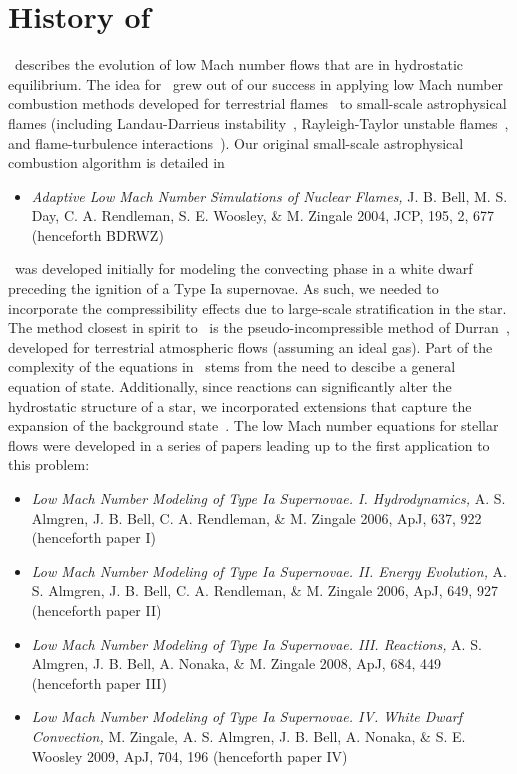\section{History of \maestro}

\maestro\ describes the evolution of low Mach number flows that are in
hydrostatic equilibrium.  The idea for \maestro\ grew out of our
success in applying low Mach number combustion methods developed for
terrestrial flames~\cite{DayBell00} to small-scale astrophysical
flames (including Landau-Darrieus instability~\cite{SNld},
Rayleigh-Taylor unstable flames~\cite{SNrt3d}, and flame-turbulence
interactions~\cite{SNturb}).  Our original small-scale astrophysical
combustion algorithm is detailed in
\begin{itemize}
\item {\em Adaptive Low Mach Number Simulations of Nuclear Flames,}
J. B. Bell, M. S. Day, C. A. Rendleman, S. E. Woosley, \& M. Zingale
2004, JCP, 195, 2, 677 (henceforth BDRWZ)
\end{itemize}

\noindent \maestro\ was developed initially for modeling the convecting
phase in a white dwarf preceding the ignition of a Type Ia supernovae.
As such, we needed to incorporate the compressibility effects due to
large-scale stratification in the star.  The method closest in spirit
to \maestro\ is the pseudo-incompressible method of
Durran~\cite{durran}, developed for terrestrial atmospheric flows
(assuming an ideal gas).  Part of the complexity of the equations in
\maestro\ stems from the need to descibe a general equation of state.
Additionally, since reactions can significantly alter the hydrostatic
structure of a star, we incorporated extensions that capture the
expansion of the background state~\cite{almgren:2000}.  The low Mach
number equations for stellar flows were developed in a series of
papers leading up to the first application to this problem:
\begin{itemize}
\item {\em Low Mach Number Modeling of Type Ia
  Supernovae. I. Hydrodynamics,} A. S. Almgren, J. B. Bell, 
  C. A. Rendleman, \& M. Zingale 2006, ApJ, 637, 922 (henceforth
  paper I)
\item {\em Low Mach Number Modeling of Type Ia Supernovae. II. Energy
  Evolution,} A. S. Almgren, J. B. Bell, C. A. Rendleman, \& M. Zingale
  2006, ApJ, 649, 927 (henceforth paper II)
\item {\em Low Mach Number Modeling of Type Ia Supernovae. III. Reactions,}
  A. S. Almgren, J. B. Bell, A. Nonaka, \& M. Zingale
  2008, ApJ, 684, 449 (henceforth paper III)
\item {\em Low Mach Number Modeling of Type Ia Supernovae. IV. White Dwarf Convection,}
  M. Zingale, A. S. Almgren, J. B. Bell, A. Nonaka, \& S. E. Woosley
  2009, ApJ, 704, 196 (henceforth paper IV)
\end{itemize}


